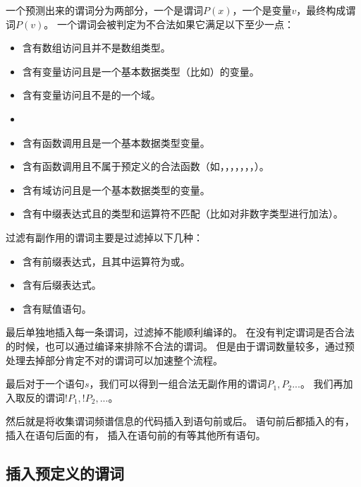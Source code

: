 一个预测出来的谓词分为两部分，一个是谓词$P(x)$，一个是变量$v$，最终构成谓词$P(v)$。
一个谓词会被判定为不合法如果它满足以下至少一点：
\begin{itemize}
\item 含有数组访问且并不是数组类型。
\item 含有变量访问且是一个基本数据类型（比如）的变量。
\item 含有变量访问且不是的一个域。
\item {}
\item 含有函数调用且是一个基本数据类型变量。
\item 含有函数调用且不属于预定义的合法函数（如，，，，，，，）。
\item 含有域访问且是一个基本数据类型的变量。
\item 含有中缀表达式且的类型和运算符不匹配（比如对非数字类型进行加法）。
\end{itemize}

过滤有副作用的谓词主要是过滤掉以下几种：
\begin{itemize}
\item 含有前缀表达式，且其中运算符为\mycode{++}或\mycode{--}。
\item 含有后缀表达式。
\item 含有赋值语句。
\end{itemize}

最后单独地插入每一条谓词，过滤掉不能顺利编译的。
在没有判定谓词是否合法的时候，也可以通过编译来排除不合法的谓词。
但是由于谓词数量较多，通过预处理去掉部分肯定不对的谓词可以加速整个流程。

最后对于一个语句$s$，我们可以得到一组合法无副作用的谓词${P_1,P_2...}$。
我们再加入取反的谓词${!P_1, !P_2, ...}$。

然后就是将收集谓词频谱信息的代码插入到语句前或后。
语句前后都插入的有，
插入在语句后面的有，
插入在语句前的有等其他所有语句。

\subsection{插入预定义的谓词}


